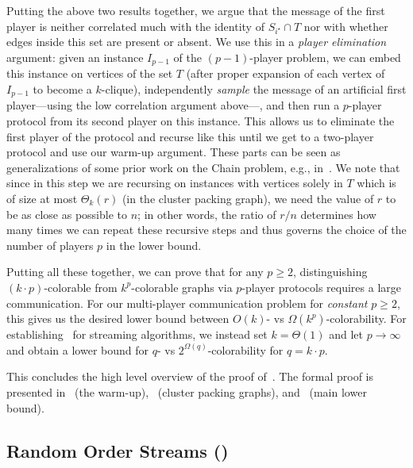 \documentclass[11pt]{article}
\theoremstyle{definition}
\renewcommand{\geq}{\geqslant}
\newcommand{\istar}{\ensuremath{i^{\star}}}
\begin{document}
Putting the above two results together, we argue that the message of the first player is neither correlated much with the identity of $S_{\istar} \cap T$ nor with whether edges inside this set are present or absent. We use this in a \emph{player elimination} argument: given an instance $I_{p-1}$ of the $(p-1)$-player problem, we can embed this instance on vertices of the set $T$ (after proper expansion of each vertex of $I_{p-1}$ to become a $k$-clique), independently \emph{sample} the 
message of an artificial first player---using the low correlation argument above---, and then run a $p$-player protocol from its second player on this instance. This allows us to eliminate the first player of the protocol
and recurse like this until we get to a two-player protocol and use our warm-up argument. These parts can be seen as generalizations of 
some prior work on the Chain problem, e.g., in~\cite{Chakrabarti07,FeldmanNSZ20}. We note that since in this step we are recursing on instances with vertices solely in $T$ which is of size at most $\Theta_k(r)$ (in the cluster packing graph), 
we need the value of $r$ to be as close as possible to $n$; in other words, the ratio of $r/n$ determines how many times we can repeat these recursive steps and thus governs the choice of the number of players $p$ in the lower bound.  

Putting all these together, we can prove that for any $p \geq 2$, distinguishing $(k \cdot p)$-colorable from $k^p$-colorable graphs via $p$-player protocols requires a large communication. 
For our multi-player communication problem for \emph{constant} $p \geq 2$, this gives us the desired lower bound between $O(k)$- vs $\Omega(k^p)$-colorability. For establishing~ for streaming algorithms, 
we instead set $k = \Theta(1)$ and let $p \rightarrow \infty$
and obtain a lower bound for $q$- vs $2^{\Omega(q)}$-colorability for $q = k \cdot p$. 

This concludes the high level overview of the proof of~. The formal proof is  presented in~ (the warm-up),~ (cluster packing graphs), and~ (main lower bound). 


\subsection{Random Order Streams ()}\label{sec:tech-rand}
\end{document}
